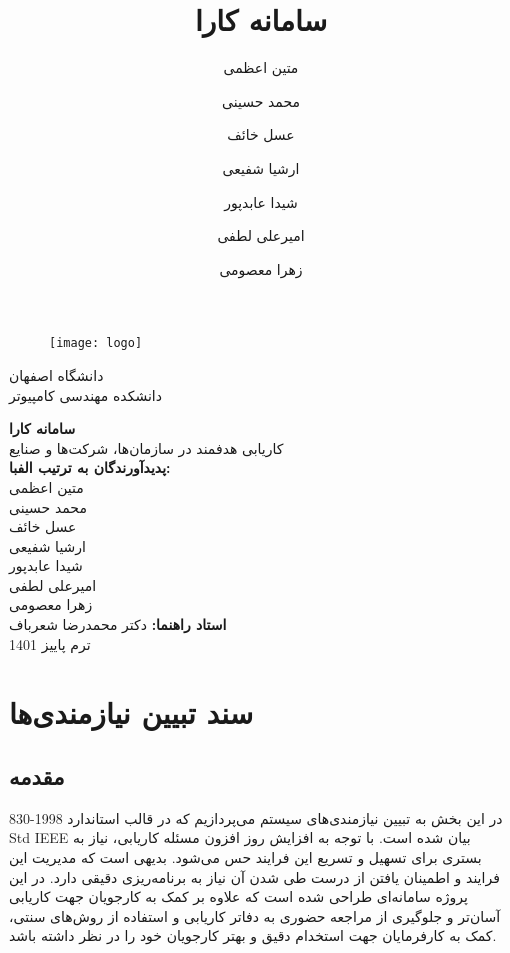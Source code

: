 \documentclass[12pt]{article}
\author{متین اعظمی}
\author{محمد حسینی}
\author{عسل خائف}
\author{ارشیا شفیعی}
\author{شیدا عابدپور}
\author{امیرعلی لطفی}
\author{زهرا معصومی}
\title{سامانه کارا}
\begin{document}
	\begin{figure}
		\centering
		\texttt{[image: logo]}
	\end{figure}
	\begin{center}
		دانشگاه اصفهان\\
		دانشکده مهندسی کامپیوتر
		\vspace{2\baselineskip}

		{\Huge \textbf{سامانه کارا}}\\

		\vspace{1\baselineskip}
		کاریابی هدفمند در سازمان‌ها، شرکت‌ها و صنایع\\
		\vspace{2\baselineskip}
		\textbf{پدیدآورندگان به ترتیب الفبا:}\\
		متین اعظمی\\
		محمد حسینی\\
		عسل خائف\\
		ارشیا شفیعی\\
		شیدا عابدپور\\
		امیرعلی لطفی\\
		زهرا معصومی\\

		\vspace{1\baselineskip}
		{\textbf{استاد راهنما:}}
		 دکتر محمدرضا شعرباف\\
		\vspace{2\baselineskip}
		ترم پاییز 1401

	\end{center}
	\newpage
	\tableofcontents
	\newpage

	\section{سند تبیین نیازمندی‌ها}

	\subsection{مقدمه}
	در این بخش به تبیین نیازمندی‌های سیستم می‌پردازیم که در قالب استاندارد 1998-830 Std IEEE بیان شده است.
	با توجه به افزایش روز افزون مسئله کاریابی، نیاز به بستری برای تسهیل و تسریع این فرایند حس می‌شود. بدیهی است که مدیریت این فرایند و اطمینان یافتن از درست طی شدن آن نیاز به برنامه‌ریزی دقیقی دارد.
	در این پروژه سامانه‌ای طراحی شده است که علاوه بر کمک به کارجویان جهت کاریابی آسان‌تر و جلوگیری از مراجعه حضوری به دفاتر کاریابی و استفاده از روش‌های سنتی، کمک به کارفرمایان جهت استخدام دقیق و بهتر کارجویان خود را در نظر داشته باشد.
\end{document}
